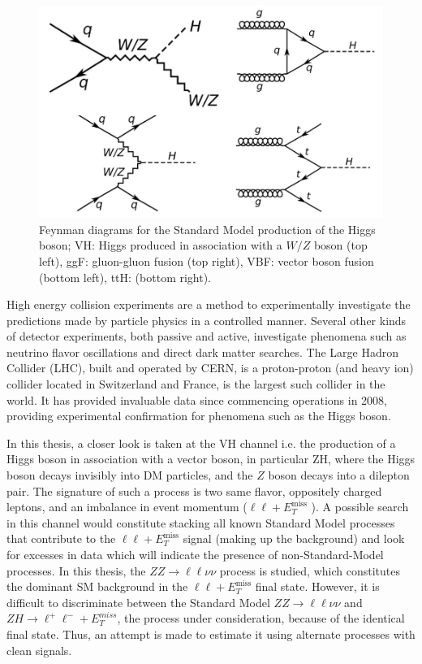 \documentclass[12pt,a4paper,openright,twoside]{report}
\newcommand{\ZZ}{$ZZ\to \ell\ell\nu\nu$ }
\newcommand{\llM}{$\ell\ell+E_T^{\mathrm{miss}}$ }
\begin{document}
\begin{figure}[H]
\centering
\includegraphics[width=0.5\linewidth]{higgs_production.png}
\caption{Feynman diagrams for the Standard Model production of the Higgs boson; VH: Higgs produced in association with a $W/Z$ boson (top left), ggF: gluon-gluon fusion (top right), VBF: vector boson fusion (bottom left), ttH: (bottom right).}
\label{fig:higgs}
\end{figure}

High energy collision experiments are a method to experimentally investigate the predictions made by particle physics in a controlled manner. Several other kinds of detector experiments, both passive and active, investigate phenomena such as neutrino flavor oscillations and direct dark matter searches. The Large Hadron Collider (LHC), built and operated by CERN, is a proton-proton (and heavy ion) collider located in Switzerland and France, is the largest such collider in the world. It has provided invaluable data since commencing operations in 2008, providing experimental confirmation for phenomena such as the Higgs boson.

In this thesis, a closer look is taken at the VH channel i.e. the production of a Higgs boson in association with a vector boson, in particular ZH, where the Higgs boson decays invisibly into DM particles, and the $Z$ boson decays into a dilepton pair. The signature of such a process is two same flavor, oppositely charged leptons, and an imbalance in event momentum (\llM). A possible search in this channel would constitute stacking all known Standard Model processes that contribute to the \llM signal (making up the background) and look for excesses in data which will indicate the presence of non-Standard-Model processes. In this thesis, the \ZZ process is studied, which constitutes the dominant SM background in the \llM final state. However, it is difficult to discriminate between the Standard Model \ZZ and $ZH\to \ell^+\ell^-+E_T^{miss}$, the process under consideration, because of the identical final state. Thus, an attempt is made to estimate it using alternate processes with clean signals. 
\end{document}
